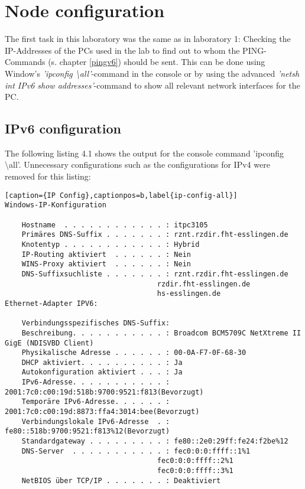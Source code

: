 \section{Node configuration}
The first task in this laboratory was the same as in laboratory 1: Checking the IP-Addresses of the PCs used in the lab to find out to whom the PING-Commands (s. chapter \ref{pingv6}) should be sent. This can be done using Window's \textit{'ipconfig \textbackslash all'}-command in the console or by using the advanced \textit{'netsh int IPv6 show addresses'}-command to show all relevant network interfaces for the PC.
\subsection{IPv6 configuration}
The following listing 4.1 shows the output for the console command 'ipconfig \textbackslash all'. Unnecessary configurations such as the configurations for IPv4 were removed for this listing:
\\ 
\begin{lstlisting}[caption={IP Config},captionpos=b,label{ip-config-all}]
Windows-IP-Konfiguration

	Hostname  . . . . . . . . . . . . : itpc3105
	Primäres DNS-Suffix . . . . . . . : rznt.rzdir.fht-esslingen.de
	Knotentyp . . . . . . . . . . . . : Hybrid
	IP-Routing aktiviert  . . . . . . : Nein
	WINS-Proxy aktiviert  . . . . . . : Nein
	DNS-Suffixsuchliste . . . . . . . : rznt.rzdir.fht-esslingen.de
									rzdir.fht-esslingen.de
									hs-esslingen.de
Ethernet-Adapter IPV6:

	Verbindungsspezifisches DNS-Suffix:
	Beschreibung. . . . . . . . . . . : Broadcom BCM5709C NetXtreme II GigE (NDISVBD Client)
	Physikalische Adresse . . . . . . : 00-0A-F7-0F-68-30
	DHCP aktiviert. . . . . . . . . . : Ja
	Autokonfiguration aktiviert . . . : Ja
	IPv6-Adresse. . . . . . . . . . . : 2001:7c0:c00:19d:518b:9700:9521:f813(Bevorzugt)
	Temporäre IPv6-Adresse. . . . . . : 2001:7c0:c00:19d:8873:ffa4:3014:bee(Bevorzugt)
	Verbindungslokale IPv6-Adresse  . : fe80::518b:9700:9521:f813%12(Bevorzugt)
	Standardgateway . . . . . . . . . : fe80::2e0:29ff:fe24:f2be%12
	DNS-Server  . . . . . . . . . . . : fec0:0:0:ffff::1%1
									fec0:0:0:ffff::2%1
									fec0:0:0:ffff::3%1
	NetBIOS über TCP/IP . . . . . . . : Deaktiviert
\end{lstlisting}
